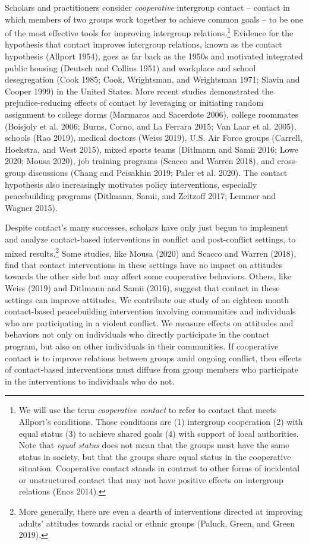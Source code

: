 \documentclass[11pt]{article}
\begin{document}
Scholars and practitioners consider \emph{cooperative} intergroup
contact -- contact in which members of two groups work together to
achieve common goals -- to be one of the most effective tools for
improving intergroup relations.\footnote{We will use the term
  \emph{cooperative contact} to refer to contact that meets Allport's
  conditions. Those conditions are (1) intergroup cooperation (2) with
  equal status (3) to achieve shared goals (4) with support of local
  authorities. Note that \emph{equal status} does not mean that the
  groups must have the same status in society, but that the groups share
  equal status in the cooperative situation. Cooperative contact stands
  in contrast to other forms of incidental or unstructured contact that
  may not have positive effects on intergroup relations (Enos 2014).}
Evidence for the hypothesis that contact improves intergroup relations,
known as the contact hypothesis (Allport 1954), goes as far back as the
1950s and motivated integrated public housing (Deutsch and Collins 1951)
and workplace and school desegregation (Cook 1985; Cook, Wrightsman, and
Wrightsman 1971; Slavin and Cooper 1999) in the United States. More
recent studies demonstrated the prejudice-reducing effects of contact by
leveraging or initiating random assignment to college dorms (Marmaros
and Sacerdote 2006), college roommates (Boisjoly et al. 2006; Burns,
Corno, and La Ferrara 2015; Van Laar et al. 2005), schools (Rao 2019),
medical doctors (Weiss 2019), U.S. Air Force groups (Carrell, Hoekstra,
and West 2015), mixed sports teams (Ditlmann and Samii 2016; Lowe 2020;
Mousa 2020), job training programs (Scacco and Warren 2018), and
cross-group discussions (Chang and Peisakhin 2019; Paler et al. 2020).
The contact hypothesis also increasingly motivates policy interventions,
especially peacebuilding programs (Ditlmann, Samii, and Zeitzoff 2017;
Lemmer and Wagner 2015).

Despite contact's many successes, scholars have only just begun to
implement and analyze contact-based interventions in conflict and
post-conflict settings, to mixed results.\footnote{More generally, there
  are even a dearth of interventions directed at improving adults'
  attitudes towards racial or ethnic groups (Paluck, Green, and Green
  2019).} Some studies, like Mousa (2020) and Scacco and Warren (2018),
find that contact interventions in these settings have no impact on
attitudes towards the other side but may affect some cooperative
behaviors. Others, like Weiss (2019) and Ditlmann and Samii (2016),
suggest that contact in these settings can improve attitudes. We
contribute our study of an eighteen month contact-based peacebuilding
intervention involving communities and individuals who are participating
in a violent conflict. We measure effects on attitudes and behaviors not
only on individuals who directly participate in the contact program, but
also on other individuals in their communities. If cooperative contact
is to improve relations between groups amid ongoing conflict, then
effects of contact-based interventions must diffuse from group members
who participate in the interventions to individuals who do not.
\end{document}
